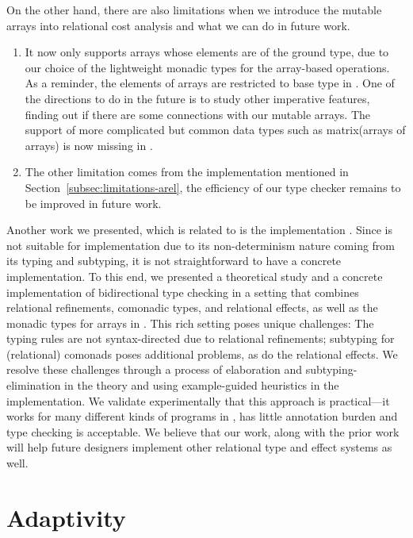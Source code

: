  On the other hand, there are also limitations when we introduce the mutable arrays into relational cost analysis and what we can do in future work.
 \begin{enumerate}
     \item {\THESYSTEM} It now only supports arrays whose elements are of the ground type, due to our choice of the lightweight monadic types for the array-based operations. As a reminder, the elements of arrays are restricted to base type in {\Arel}. One of the directions to do in the future is to study other imperative features, finding out if there are some connections with our mutable arrays.
 The support of more complicated but common data types such as matrix(arrays of arrays) is now missing in {\Arel}. 
   \item The other limitation comes from the implementation mentioned in Section~\ref{subsec:limitations-arel}, the efficiency of our type checker remains to be improved in future work. 
 \end{enumerate}
 
Another work we presented, which is related to {\Arel} is the implementation {\BIAREL}. Since {\Arel} is not suitable for implementation due to its non-determinism nature coming from its typing and subtyping, it is not straightforward to have a concrete implementation. To this end, we presented a theoretical study and a concrete implementation
of bidirectional type checking in a setting that combines relational
refinements, comonadic types, and relational effects, as well as the monadic types for arrays in {\Arel}. This rich setting
poses unique challenges: The typing rules are not syntax-directed due
to relational refinements; subtyping for (relational) comonads
poses additional problems, as do the relational effects. We resolve
these challenges through a process of elaboration and
subtyping-elimination in the theory and using example-guided
heuristics in the implementation. We validate experimentally that this
approach is practical---it works for many different kinds of programs in {\Arel},
has little annotation burden and type checking is acceptable. We believe that our work, along with the prior work~\citet{cicek2018:thesis} will help future designers implement other relational type and effect systems as well.

 
 \section{Adaptivity}
 
